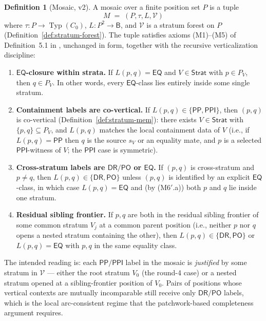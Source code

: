 \documentclass[11pt]{article}
\theoremstyle{definition}
\newtheorem{definition}[theorem]{Definition}
\theoremstyle{remark}
\newcommand{\DR}{\mathsf{DR}}
\newcommand{\PO}{\mathsf{PO}}
\newcommand{\PP}{\mathsf{PP}}
\newcommand{\PPI}{\mathsf{PPI}}
\newcommand{\EQ}{\mathsf{EQ}}
\newcommand{\Base}{\mathsf{B}}
\newcommand{\Typ}{\operatorname{Typ}}
\newcommand{\Stratum}{\mathsf{Strat}}
\begin{document}
\begin{definition}[Mosaic, v2]\label{def:mosaic-v2}
A mosaic over a finite position set $P$ is a tuple
\[
  M\;=\;(P,\tau,L,\mathcal V)
\]
where $\tau:P\to\Typ(C_0)$, $L:P^2\to\Base$, and $\mathcal V$ is a
stratum forest on $P$ (Definition~\ref{def:stratum-forest}).  The
tuple satisfies axioms (M1)--(M5) of Definition~5.1 in
\cite{GPT55Repaired}, unchanged in form, together with the recursive
verticalization discipline:
\begin{enumerate}[label=(M6$'$.\alph*)]
\item \textbf{$\EQ$-closure within strata.}  If $L(p,q)=\EQ$ and
  $V\in\Stratum$ with $p\in P_V$, then $q\in P_V$.  In other words,
  every $\EQ$-class lies entirely inside some single stratum.

\item \textbf{Containment labels are co-vertical.}  If $L(p,q)\in
  \{\PP,\PPI\}$, then $(p,q)$ is co-vertical
  (Definition~\ref{def:stratum-mem}): there exists $V\in\Stratum$ with
  $\{p,q\}\subseteq P_V$, and $L(p,q)$ matches the local containment
  data of $V$ (i.e., if $L(p,q)=\PP$ then $q$ is the source $s_V$ or
  an equality mate, and $p$ is a selected $\PPI$-witness of $V$; the
  $\PPI$ case is symmetric).

\item \textbf{Cross-stratum labels are $\DR/\PO$ or $\EQ$.}  If $(p,q)$
  is cross-stratum and $p\neq q$, then $L(p,q)\in\{\DR,\PO\}$ unless
  $(p,q)$ is identified by an explicit $\EQ$-class, in which case
  $L(p,q)=\EQ$ and (by (M6$'$.a)) both $p$ and $q$ lie inside one
  stratum.

\item \textbf{Residual sibling frontier.}  If $p,q$ are both in the
  residual sibling frontier of some common stratum $V_j$ at a common
  parent position (i.e., neither $p$ nor $q$ opens a nested stratum
  containing the other), then $L(p,q)\in\{\DR,\PO\}$ or $L(p,q)=\EQ$
  with $p,q$ in the same equality class.
\end{enumerate}
\end{definition}

The intended reading is: each $\PP/\PPI$ label in the mosaic is
\emph{justified} by some stratum in $\mathcal V$ — either the root
stratum $V_0$ (the round-4 case) or a nested stratum opened at a
sibling-frontier position of $V_0$.  Pairs of positions whose vertical
contexts are mutually incomparable still receive only $\DR/\PO$
labels, which is the local arc-consistent regime that the
patchwork-based completeness argument requires.
\end{document}
